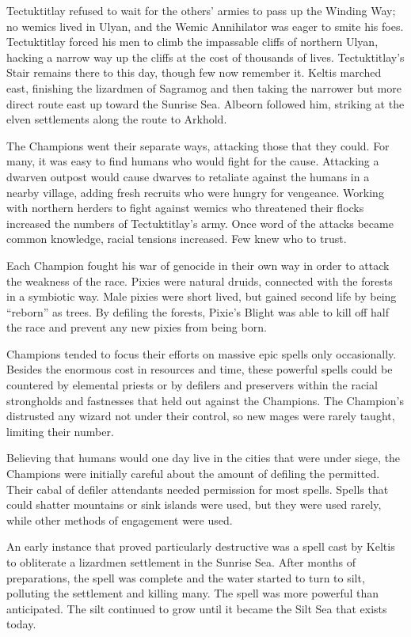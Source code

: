 Tectuktitlay refused to wait for the others' armies to pass up the Winding Way; no wemics lived in Ulyan, and the Wemic Annihilator was eager to smite his foes. Tectuktitlay forced his men to climb the impassable cliffs of northern Ulyan, hacking a narrow way up the cliffs at the cost of thousands of lives. Tectuktitlay's Stair remains there to this day, though few now remember it. Keltis marched east, finishing the lizardmen of Sagramog and then taking the narrower but more direct route east up toward the Sunrise Sea. Albeorn followed him, striking at the elven settlements along the route to Arkhold.

The Champions went their separate ways, attacking those that they could. For many, it was easy to find humans who would fight for the cause. Attacking a dwarven outpost would cause dwarves to retaliate against the humans in a nearby village, adding fresh recruits who were hungry for vengeance. Working with northern herders to fight against wemics who threatened their flocks increased the numbers of Tectuktitlay's army. Once word of the attacks became common knowledge, racial tensions increased. Few knew who to trust.

Each Champion fought his war of genocide in their own way in order to attack the weakness of the race. Pixies were natural druids, connected with the forests in a symbiotic way. Male pixies were short lived, but gained second life by being ``reborn'' as trees. By defiling the forests, Pixie's Blight was able to kill off half the race and prevent any new pixies from being born.

Champions tended to focus their efforts on massive epic spells only occasionally. Besides the enormous cost in resources and time, these powerful spells could be countered by elemental priests or by defilers and preservers within the racial strongholds and fastnesses that held out against the Champions. The Champion's distrusted any wizard not under their control, so new mages were rarely taught, limiting their number.

Believing that humans would one day live in the cities that were under siege, the Champions were initially careful about the amount of defiling the permitted. Their cabal of defiler attendants needed permission for most spells. Spells that could shatter mountains or sink islands were used, but they were used rarely, while other methods of engagement were used.

An early instance that proved particularly destructive was a spell cast by Keltis to obliterate a lizardmen settlement in the Sunrise Sea. After months of preparations, the spell was complete and the water started to turn to silt, polluting the settlement and killing many. The spell was more powerful than anticipated. The silt continued to grow until it became the Silt Sea that exists today.

